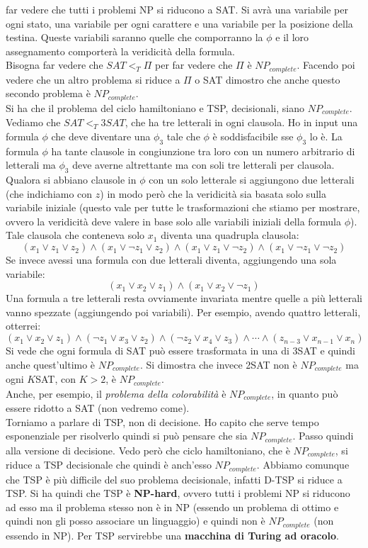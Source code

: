 far vedere che tutti i problemi NP si riducono a SAT. Si avrà una variabile per
ogni stato, una variabile per ogni carattere e una variabile per la posizione
della testina. Queste variabili saranno quelle che comporranno la $\phi$ e il
loro assegnamento comporterà la veridicità della formula.\\
Bisogna far vedere che $SAT<_T \Pi$ per far vedere che $\Pi$ è
$NP_{complete}$. Facendo poi vedere che un altro problema si riduce a $\Pi$ o SAT
dimostro che anche questo secondo problema è $NP_{complete}$. \\
Si ha che il problema del ciclo hamiltoniano e TSP, decisionali, siano
$NP_{complete}$.\\
Vediamo che $SAT<_T 3SAT$, che ha tre letterali in ogni clausola. Ho in input
una formula $\phi$ che deve diventare una $\phi_3$ tale che $\phi$ è
soddisfacibile sse $\phi_3$ lo è. La formula $\phi$ ha tante clausole in
congiunzione tra loro con un numero arbitrario di letterali ma $\phi_3$ deve
averne altrettante ma con soli tre letterali per clausola. Qualora si abbiano
clausole in $\phi$ con un solo letterale si aggiungono due letterali (che
indichiamo con $z$) in modo
però che la veridicità sia basata solo sulla variabile iniziale (questo vale per
tutte le trasformazioni che stiamo per mostrare, ovvero la veridicità deve
valere in base solo alle variabili iniziali della formula $\phi$). Tale clausola
che conteneva solo $x_1$ diventa una quadrupla clausola:
\[(x_1\lor z_1\lor z_2)\land (x_1\lor\neg z_1\lor z_2)\land (x_1\lor z_1\lor\neg
  z_2)\land(x_1\lor\neg z_1\lor\neg z_2)\] 
Se invece avessi una formula con due letterali diventa, aggiungendo una sola
variabile: 
\[(x_1\lor x_2\lor z_1)\land (x_1\lor x_2\lor \neg z_1)\]
Una formula a tre letterali resta ovviamente invariata mentre quelle a più
letterali vanno spezzate (aggiungendo poi variabili). Per esempio, avendo
quattro letterali, otterrei:
\[(x_1\lor x_2\lor z_1)\land (\neg z_1\lor x_3\lor z_2)\land (\neg z_2\lor
  x_4\lor z_3)\land\cdots\land(z_{n-3}\lor x_{n-1}\lor x_n)\]
Si vede che ogni formula di SAT può essere trasformata in una di 3SAT e quindi
anche quest'ultimo è $NP_{complete}$. Si dimostra che invece 2SAT non è $NP_{complete}$
ma ogni $K$SAT, con $K>2$, è $NP_{complete}$.\\
Anche, per esempio, il \textit{problema della colorabilità} è $NP_{complete}$, in
quanto può essere ridotto a SAT (non vedremo come).\\
Torniamo a parlare di TSP, non di decisione. Ho capito che serve tempo
esponenziale per risolverlo quindi si può pensare che sia $NP_{complete}$. Passo
quindi alla versione di decisione. Vedo però che ciclo
hamiltoniano, che è $NP_{complete}$, si riduce a TSP decisionale che quindi è
anch'esso $NP_{complete}$. Abbiamo comunque che TSP è più difficile del suo problema
decisionale, infatti D-TSP si riduce a TSP. Si ha quindi che TSP è
\textbf{NP-hard}, ovvero tutti i problemi NP si riducono ad esso ma il problema
stesso non è in NP (essendo un problema di ottimo e quindi non gli posso
associare un linguaggio) e quindi non è $NP_{complete}$ (non essendo in NP). Per
TSP servirebbe una \textbf{macchina di Turing ad oracolo}.
